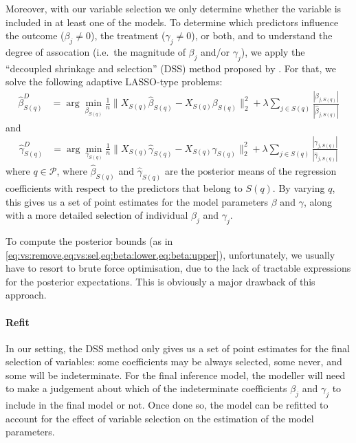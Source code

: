 \documentclass[preprint,12pt]{elsarticle}
\begin{document}
Moreover, with our variable selection we only determine whether the variable 
is included in at least one of the models.
To determine which predictors
influence the outcome ($\beta_j\neq 0$),
the treatment ($\gamma_j\neq 0$), or both,
and to understand the degree of assocation
(i.e.\ the magnitude of $\beta_j$ and/or $\gamma_j$),
we apply the 
``decoupled shrinkage and selection'' (DSS) method proposed by \citep{hahn2015}. 
For that, we solve the following adaptive LASSO-type \citep{Zou2006}
problems:
\begin{align}
	\hat{\beta}^D_{S(q)} &= 
	\arg\min_{\beta_{S(q)}} \frac{1}{n}\|X_{S(q)}\hat{\beta}_{S(q)}
	- X_{S(q)} \beta_{S(q)}\|_2^2 + \lambda\sum_{j\in S(q)} 
	\frac{|\beta_{j,S(q)}|}{|\hat{\beta}_{j,S(q)}|}
\end{align}
and
\begin{align}
	\hat{\gamma}^D_{S(q)} &= 
	\arg\min_{\gamma_{S(q)}} \frac{1}{n}\|X_{S(q)}\hat{\gamma}_{S(q)}
	- X_{S(q)} \gamma_{S(q)}\|_2^2 + \lambda\sum_{j\in S(q)} 
	\frac{|\gamma_{j,S(q)}|}{|\hat{\gamma}_{j,S(q)}|}
\end{align}
where $q\in \mathcal{P}$,
where $\hat{\beta}_{S(q)}$ 
and $\hat{\gamma}_{S(q)}$ are the posterior means 
of the regression coefficients with respect to
the predictors that belong to $S(q)$.
By varying $q$, this gives us a set of point estimates for the model parameters $\beta$ and $\gamma$, along with a more detailed selection of individual $\beta_j$ and $\gamma_j$.

To compute the posterior bounds (as in \cref{eq:vs:remove,eq:vs:sel,eq:beta:lower,eq:beta:upper}), unfortunately, we usually have to resort to brute force optimisation, due to the lack of tractable expressions for the posterior expectations. 
This is obviously a major drawback of this approach.

\paragraph{Refit}

In our setting, the DSS method only gives us a set of point estimates for the final selection of variables: some coefficients may be always selected, some never, and some will be indeterminate. For the final inference model, the modeller will need to make a judgement about which of the indeterminate coefficients $\beta_j$ and $\gamma_j$ to include in the final model or not. Once done so, the model can be refitted to account for the effect of variable selection on the estimation of the model parameters.
\end{document}
